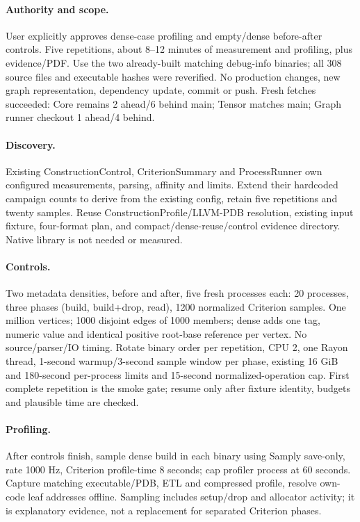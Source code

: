 \documentclass[11pt,a4paper]{article}
\begin{document}
\paragraph{Authority and scope.} User explicitly approves dense-case profiling and
empty/dense before-after controls. Five repetitions, about 8--12 minutes of measurement
and profiling, plus evidence/PDF. Use the two already-built matching debug-info binaries;
all 308 source files and executable hashes were reverified. No production changes,
new graph representation, dependency update, commit or push. Fresh fetches succeeded:
Core remains 2 ahead/6 behind main; Tensor matches main; Graph runner checkout 1 ahead/4 behind.
\paragraph{Discovery.} Existing ConstructionControl, CriterionSummary and ProcessRunner
own configured measurements, parsing, affinity and limits. Extend their hardcoded campaign
counts to derive from the existing config, retain five repetitions and twenty samples.
Reuse ConstructionProfile/LLVM-PDB resolution, existing input fixture, four-format plan,
and compact/dense-reuse/control evidence directory. Native library is not needed or measured.
\paragraph{Controls.} Two metadata densities, before and after, five fresh processes each:
20 processes, three phases (build, build+drop, read), 1200 normalized Criterion samples.
One million vertices; 1000 disjoint edges of 1000 members; dense adds one tag, numeric
value and identical positive root-base reference per vertex. No source/parser/IO timing.
Rotate binary order per repetition, CPU 2, one Rayon thread, 1-second warmup/3-second
sample window per phase, existing 16 GiB and 180-second per-process limits and
15-second normalized-operation cap. First complete repetition is the smoke gate;
resume only after fixture identity, budgets and plausible time are checked.
\paragraph{Profiling.} After controls finish, sample dense build in each binary using
Samply save-only, rate 1000 Hz, Criterion profile-time 8 seconds; cap profiler process
at 60 seconds. Capture matching executable/PDB, ETL and compressed profile, resolve
own-code leaf addresses offline. Sampling includes setup/drop and allocator activity;
it is explanatory evidence, not a replacement for separated Criterion phases.
\end{document}
